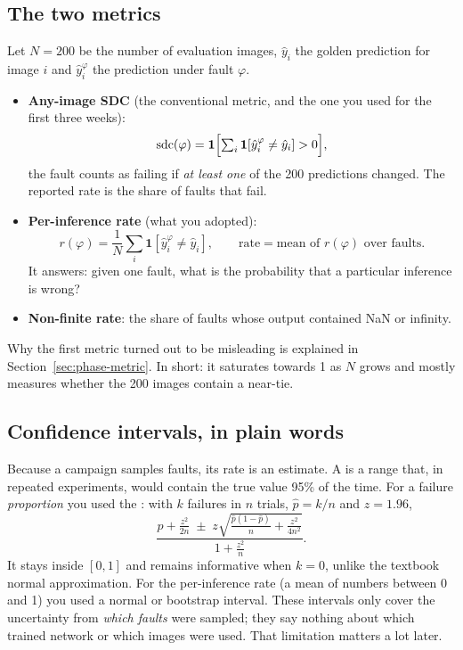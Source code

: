 \subsection{The two metrics}
Let $N=200$ be the number of evaluation images, $\hat y_i$ the golden prediction for image $i$ and $\hat y_i^{\varphi}$ the prediction
under fault $\varphi$.
\begin{itemize}
\item \textbf{Any-image SDC} (the conventional metric, and the one you used for the first three weeks):
\[
\mathrm{sdc}(\varphi)=\mathbf 1\Bigl[\textstyle\sum_{i}\mathbf 1[\hat y^{\varphi}_i\neq\hat y_i]>0\Bigr],
\]
the fault counts as failing if \emph{at least one} of the 200 predictions changed. The reported rate is the share of
faults that fail.
\item \textbf{Per-inference rate} (what you adopted):
\[
r(\varphi)=\frac1N\sum_i\mathbf 1[\hat y^{\varphi}_i\neq\hat y_i],\qquad
\text{rate}=\text{mean of }r(\varphi)\text{ over faults.}
\]
It answers: given one fault, what is the probability that a particular inference is wrong?
\item \textbf{Non-finite rate}: the share of faults whose output contained NaN or infinity.
\end{itemize}
Why the first metric turned out to be misleading is explained in Section~\ref{sec:phase-metric}. In short: it saturates
towards 1 as $N$ grows and mostly measures whether the 200 images contain a near-tie.

\subsection{Confidence intervals, in plain words}
Because a campaign samples faults, its rate is an estimate. A  is a range that, in repeated experiments,
would contain the true value 95\% of the time. For a failure \emph{proportion} you used the : with $k$ failures in
$n$ trials, $\hat p=k/n$ and $z=1.96$,
\[
\frac{\hat p+\frac{z^2}{2n}\;\pm\;z\sqrt{\frac{\hat p(1-\hat p)}{n}+\frac{z^2}{4n^2}}}{1+\frac{z^2}{n}} .
\]
It stays inside $[0,1]$ and remains informative when $k=0$, unlike the textbook normal approximation. For the per-inference rate (a mean
of numbers between 0 and 1) you used a normal or bootstrap interval. These intervals only cover the uncertainty from \emph{which
faults} were sampled; they say nothing about which trained network or which images were used. That limitation matters a lot later.

